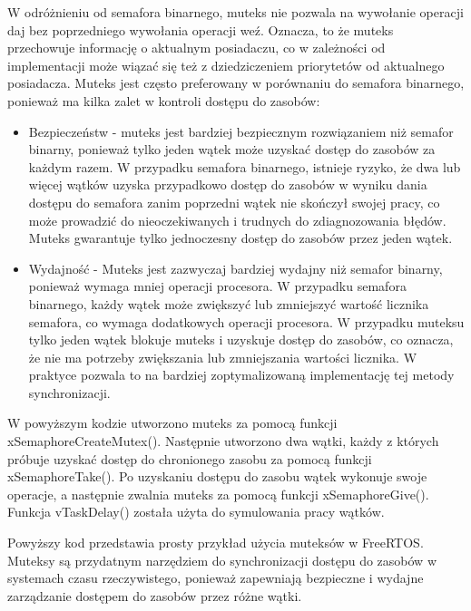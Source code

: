 W odróżnieniu od semafora binarnego, muteks nie pozwala na wywołanie operacji daj bez poprzedniego wywołania operacji weź.
Oznacza, to że muteks przechowuje informację o aktualnym posiadaczu, co w zależności od implementacji może wiązać się też z
dziedziczeniem priorytetów od aktualnego posiadacza. Muteks jest często preferowany w porównaniu do semafora binarnego,
ponieważ ma kilka zalet w kontroli dostępu do zasobów:
\begin{itemize}
    \item Bezpieczeństw - muteks jest bardziej bezpiecznym rozwiązaniem niż semafor binarny, ponieważ tylko jeden wątek
          może uzyskać dostęp do zasobów za każdym razem. W przypadku semafora binarnego, istnieje ryzyko, że dwa lub więcej
          wątków uzyska przypadkowo dostęp do zasobów w wyniku dania dostępu do semafora zanim poprzedni wątek nie skończył swojej pracy,
          co może prowadzić do nieoczekiwanych i trudnych do zdiagnozowania błędów. Muteks gwarantuje tylko jednoczesny dostęp do zasobów przez jeden wątek.
    \item Wydajność - Muteks jest zazwyczaj bardziej wydajny niż semafor binarny, ponieważ wymaga mniej operacji procesora.
          W przypadku semafora binarnego, każdy wątek może zwiększyć lub zmniejszyć wartość licznika semafora, co wymaga dodatkowych operacji procesora.
          W przypadku muteksu tylko jeden wątek blokuje muteks i uzyskuje dostęp do zasobów, co oznacza, że nie ma potrzeby zwiększania lub
          zmniejszania wartości licznika. W praktyce pozwala to na bardziej zoptymalizowaną implementację tej metody synchronizacji.
\end{itemize}



W powyższym kodzie utworzono muteks za pomocą funkcji xSemaphoreCreateMutex(). Następnie utworzono dwa wątki, każdy z których próbuje uzyskać
dostęp do chronionego zasobu za pomocą funkcji xSemaphoreTake(). Po uzyskaniu dostępu do zasobu wątek wykonuje swoje operacje,
a następnie zwalnia muteks za pomocą funkcji xSemaphoreGive(). Funkcja vTaskDelay() została użyta do symulowania pracy wątków.

Powyższy kod przedstawia prosty przykład użycia muteksów w FreeRTOS. Muteksy są przydatnym narzędziem do synchronizacji dostępu do zasobów w systemach
czasu rzeczywistego, ponieważ zapewniają bezpieczne i wydajne zarządzanie dostępem do zasobów przez różne wątki.
